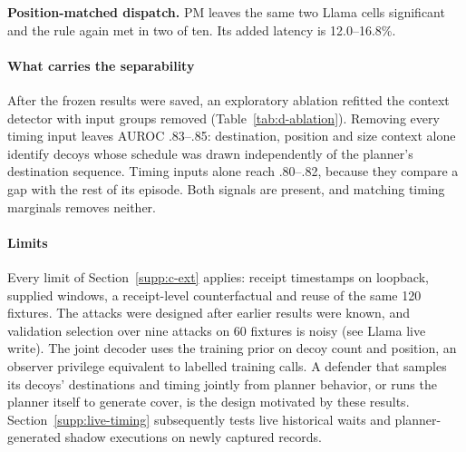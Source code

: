 \textbf{Position-matched dispatch.} PM leaves the same two Llama cells significant and the rule again met in two of ten. Its added latency is 12.0--16.8\%.



\paragraph{What carries the separability}
After the frozen results were saved, an exploratory ablation refitted the context detector with input groups removed (Table~\ref{tab:d-ablation}). Removing every timing input leaves AUROC .83--.85: destination, position and size context alone identify decoys whose schedule was drawn independently of the planner's destination sequence. Timing inputs alone reach .80--.82, because they compare a gap with the rest of its episode. Both signals are present, and matching timing marginals removes neither.

\paragraph{Limits}
Every limit of Section~\ref{supp:c-ext} applies: receipt timestamps on loopback, supplied windows, a receipt-level counterfactual and reuse of the same 120 fixtures. The attacks were designed after earlier results were known, and validation selection over nine attacks on 60 fixtures is noisy (see Llama live write). The joint decoder uses the training prior on decoy count and position, an observer privilege equivalent to labelled training calls. A defender that samples its decoys' destinations and timing jointly from planner behavior, or runs the planner itself to generate cover, is the design motivated by these results. Section~\ref{supp:live-timing} subsequently tests live historical waits and planner-generated shadow executions on newly captured records.
